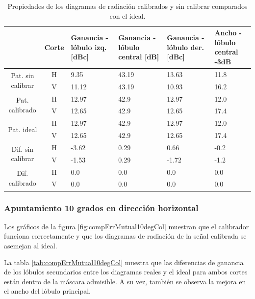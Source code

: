 \begin{table}[H]
  \footnotesize
  \centering
  \begin{tabular}{|c|c|p{2cm}|p{2.5cm}|p{2.5cm}|p{2.5cm}|}
    \cline{2-6}
    \multicolumn{1}{c|}{} & Corte & Ganancia - lóbulo izq. [dBc] & Ganancia - lóbulo central [dB] &
    Ganancia - lóbulo der. [dBc] & Ancho - lóbulo central -3dB \tabularnewline\hline
    \multirow{2}{2cm}{Pat. sin calibrar} & H & 9.35 & 43.19 & 13.63 & 11.8 \tabularnewline\cline{2-6}
     & V & 11.12 & 43.19 & 10.93 & 16.2 \tabularnewline\hline
    \multirow{2}{2cm}{Pat. calibrado} & H & 12.97 & 42.9 & 12.97 & 12.0 \tabularnewline\cline{2-6}
     & V & 12.65 & 42.9 & 12.65 & 17.4 \tabularnewline\hline
    \multirow{2}{2cm}{Pat. ideal} & H & 12.97 & 42.9 & 12.97 & 12.0 \tabularnewline\cline{2-6}
     & V & 12.65 & 42.9 & 12.65 & 17.4 \tabularnewline\hline
    \multirow{2}{2cm}{Dif. sin calibrar} & H & -3.62 & 0.29 & 0.66 & -0.2\tabularnewline\cline{2-6}
     & V & -1.53 & 0.29 & -1.72 & -1.2 \tabularnewline\hline
    \multirow{2}{2cm}{Dif. calibrado} & H & 0.0 & 0.0 & 0.0 & 0.0 \tabularnewline\cline{2-6}
     & V & 0.0 & 0.0 & 0.0 & 0.0 \tabularnewline\hline
  \end{tabular}
  \caption{Propiedades de los diagramas de radiación calibrados y sin calibrar comparados con el ideal.}
  \label{tab:compErrMutual0deg}
\end{table}


\subsubsection{Apuntamiento 10 grados en dirección horizontal}

Los gráficos de la figura \ref{fig:compErrMutual10degCol} muestran que el calibrador funciona correctamente y que los diagramas de 
radiación de la señal calibrada se asemejan al ideal. 

La tabla \ref{tab:compErrMutual10degCol} muestra que las diferencias de ganancia de los lóbulos secundarios entre los diagramas 
reales y el ideal para ambos cortes están dentro de la máscara admisible. A su vez, también se observa la mejora en el ancho 
del lóbulo principal.

